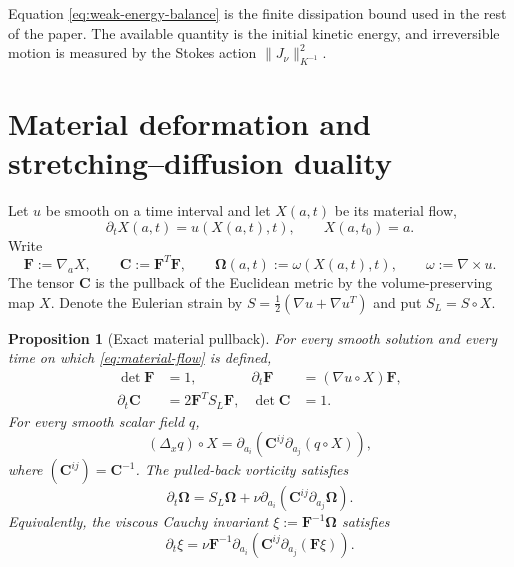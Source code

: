 \documentclass[11pt]{amsart}
\numberwithin{equation}{section}
\theoremstyle{plain}
\newtheorem{proposition}[proposition]{Proposition}
\theoremstyle{definition}
\theoremstyle{remark}
\newcommand{\MaterialF}{\mathbf F}
\newcommand{\MaterialMetric}{\mathbf C}
\newcommand{\MaterialVort}{\boldsymbol\Omega}
\begin{document}
Equation \eqref{eq:weak-energy-balance} is the finite dissipation bound used in
the rest of the paper.  The available quantity is the initial kinetic energy,
and irreversible motion is measured by the Stokes action
\(\|J_\nu\|_{K^{-1}}^2\).

\section{Material deformation and stretching--diffusion duality}
\label{sec:material-duality}

Let \(u\) be smooth on a time interval and let \(X(a,t)\) be its material
flow,
\begin{equation}\label{eq:material-flow}
 \partial_tX(a,t)=u(X(a,t),t),
 \qquad X(a,t_0)=a.
\end{equation}
Write
\begin{equation}\label{eq:material-tensors}
 \MaterialF:=\nabla_aX,
 \qquad
 \MaterialMetric:=\MaterialF^T\MaterialF,
 \qquad
 \MaterialVort(a,t):=\omega(X(a,t),t),
 \qquad \omega:=\nabla\times u.
\end{equation}
The tensor \(\MaterialMetric\) is the pullback of the Euclidean metric by the
volume-preserving map \(X\).  Denote the Eulerian strain by
\(S=\tfrac12(\nabla u+\nabla u^T)\) and put
\(S_L=S\circ X\).

\begin{proposition}[Exact material pullback]
\label{prop:material-pullback}
For every smooth solution and every time on which \eqref{eq:material-flow}
is defined,
\begin{align}
 \det\MaterialF&=1,
 &\partial_t\MaterialF&=(\nabla u\circ X)\MaterialF,
 \label{eq:F-evolution}\\
 \partial_t\MaterialMetric&=2\MaterialF^TS_L\MaterialF,
 &\det\MaterialMetric&=1.                 \label{eq:g-evolution}
\end{align}
For every smooth scalar field \(q\),
\begin{equation}\label{eq:laplacian-pullback}
 (\Delta_xq)\circ X
 =\partial_{a_i}\!\left(\MaterialMetric^{ij}
             \partial_{a_j}(q\circ X)\right),
\end{equation}
where \((\MaterialMetric^{ij})=\MaterialMetric^{-1}\).  The pulled-back
vorticity satisfies
\begin{equation}\label{eq:material-vorticity}
 \partial_t\MaterialVort
 =S_L\MaterialVort
  +\nu\partial_{a_i}\!\left(\MaterialMetric^{ij}
                  \partial_{a_j}\MaterialVort\right).
\end{equation}
Equivalently, the viscous Cauchy invariant
\(\xi:=\MaterialF^{-1}\MaterialVort\) satisfies
\begin{equation}\label{eq:viscous-cauchy-invariant}
 \partial_t\xi
 =\nu\MaterialF^{-1}\partial_{a_i}\!\left(
       \MaterialMetric^{ij}\partial_{a_j}(\MaterialF\xi)\right).
\end{equation}
\end{proposition}
\end{document}
